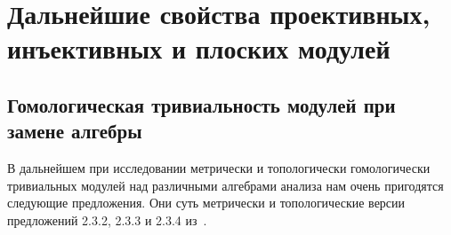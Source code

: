 \section{
    Дальнейшие свойства проективных, инъективных и плоских модулей
}\label{
    SectionFurtherPropertiesOfProjectiveInjectiveAndFlatModules
}


\subsection{
    Гомологическая тривиальность модулей при замене алгебры
}\label{
    SubSectionHomologicalTrivialityOfModulesUnderChangeOfAlgebra
}

В дальнейшем при исследовании метрически и топологически гомологически
тривиальных модулей над различными алгебрами анализа нам очень пригодятся
следующие предложения. Они суть метрически и топологические версии предложений
2.3.2, 2.3.3 и 2.3.4 из~\cite{RamsHomPropSemgroupAlg}.

